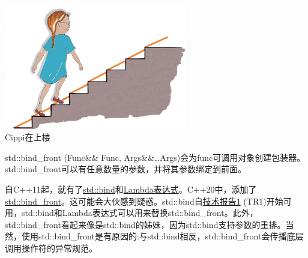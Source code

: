 \begin{center}
\includegraphics[width=0.6\textwidth]{content/3/chapter5/images/32.png}\\
Cippi在上楼
\end{center}


std::bind\_front (Func\&\& Func, Args\&\&…Args)会为func可调用对象创建包装器。std::bind\_front可以有任意数量的参数，并将其参数绑定到前面。

\begin{tcolorbox}[breakable,enhanced jigsaw,colback=blue!5!white,colframe=blue!75!black,title={std::bind\_front与std::bind}]
	
自C++11起，就有了\href{https://en.cppreference.com/w/cpp/utility/functional/bind}{std::bind}和\href{https://en.cppreference.com/w/cpp/language/lambda}{Lambda表达式}。C++20中，添加了\href{https://en.cppreference.com/w/cpp/utility/functional/bind_front}{std::bind\_front}。这可能会大伙感到疑惑。std::bind自\href{https://en.wikipedia.org/wiki/C%2B%2B_Technical_Report_1}{技术报告1} (TR1)开始可用，std::bind和Lambda表达式可以用来替换std::bind\_front。此外，std::bind\_front看起来像是std::bind的姊妹，因为std::bind支持参数的重排。当然，使用std::bind\_front是有原因的:与std::bind相反，std::bind\_front会传播底层调用操作符的异常规范。
	
\end{tcolorbox}

